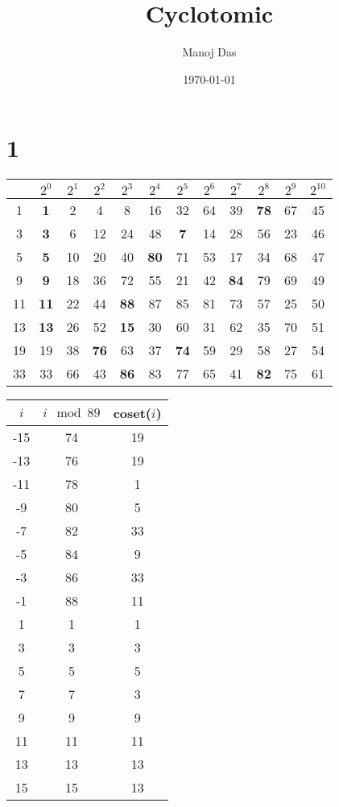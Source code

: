\documentclass[11pt,twoside]{scrartcl}
\begin{document}
\title{Cyclotomic}

\author{Manoj Das}
\date{\today}
\section{1}
\begin{center}
\begin{tabular}{c|*{11}c}
     & $2^0$ & $2^1$ & $2^2$ & $2^3$ & $2^4$ & $2^5$ & $2^6$ & $2^7$ & $2^8$ & $2^9$ & $2^{10}$ \\ \hline
     1  & \textbf{1} & 2 & 4 & 8 & 16 & 32 & 64 & 39 & \textbf{78} & 67 & 45 \\
     3  & \textbf{3} & 6 & 12 & 24 & 48 & \textbf{7} & 14 & 28 & 56 & 23 & 46 \\
     5  & \textbf{5} & 10 & 20 & 40 & \textbf{80} & 71 & 53 & 17 & 34 & 68 & 47 \\
     9  & \textbf{9} & 18 & 36 & 72 & 55 & 21 & 42 & \textbf{84} & 79 & 69 & 49 \\
     11 & \textbf{11} & 22 & 44 & \textbf{88} & 87 & 85 & 81 & 73 & 57 & 25 & 50 \\
     13 & \textbf{13} & 26 & 52 & \textbf{15} & 30 & 60 & 31 & 62 & 35 & 70 & 51 \\
     19 & 19 & 38 & \textbf{76} & 63 & 37 & \textbf{74} & 59 & 29 & 58 & 27 & 54 \\
     33 & 33 & 66 & 43 & \textbf{86} & 83 & 77 & 65 & 41 & \textbf{82} & 75 & 61
\end{tabular}
    
\end{center}

\begin{center}
\begin{tabular}{c|c|c}
    $i$ & $i \mod{89}$ & coset($i$) \\ \hline
    -15 & 74 & 19 \\
    -13 & 76 & 19 \\
    -11 & 78 & 1 \\
    -9 & 80 & 5 \\
    -7 & 82 & 33 \\
    -5 & 84 & 9 \\
    -3 & 86 & 33 \\
    -1 & 88 & 11 \\
    1 & 1 & 1 \\
    3 & 3 & 3 \\
    5 & 5 & 5 \\
    7 & 7 & 3 \\
    9 & 9 & 9 \\
    11 & 11 & 11 \\
    13 & 13 & 13 \\
    15 & 15 & 13
\end{tabular}
    
\end{center}
\end{document}
